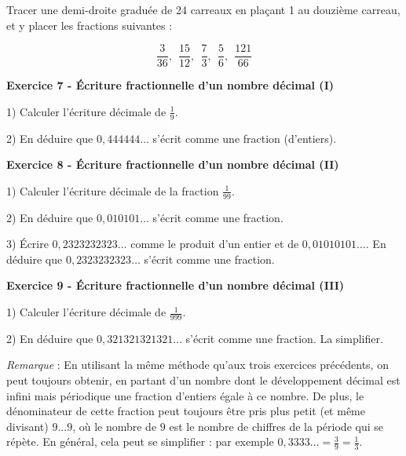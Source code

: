 \documentclass[12 pt]{article}
\theoremstyle{plain}
\newcounter{n}
\numberwithin{n}{section}
\begin{document}
Tracer une demi-droite graduée de 24 carreaux en plaçant 1 au douzième carreau, et y placer les fractions suivantes : 

\[  \frac{3}{36}, \ \ \frac{15}{12}, \ \ \frac{7}{3}, \ \ \frac{5}{6}, \ \ \frac{121}{66}   \]


\textbf{Exercice 7 - Écriture fractionnelle d'un nombre décimal (I)}

1) Calculer l'écriture décimale de $\frac19$.

2) En déduire que $0,444444\ldots$ s'écrit comme une fraction (d'entiers). 

\textbf{Exercice 8 - Écriture fractionnelle d'un nombre décimal (II)}

1) Calculer l'écriture décimale de la fraction $\frac1{99}$. 

2) En déduire que $0,010101\ldots$ s'écrit comme une fraction. 

3) Écrire $0,2323232323\ldots$ comme le produit d'un entier et de $0,01010101\ldots$. En déduire que 
$0,2323232323\ldots$ s'écrit comme une fraction. 


\textbf{Exercice 9 - Écriture fractionnelle d'un nombre décimal (III)}

1) Calculer l'écriture décimale de $\frac1{999}$. 

2) En déduire que $0,321321321321\ldots$ s'écrit comme une fraction. La simplifier. 

\emph{Remarque} : En utilisant la même méthode qu'aux trois exercices précédents, on peut toujours obtenir, 
en partant d'un nombre dont le développement décimal est infini mais périodique une fraction d'entiers égale à ce nombre. De plus, le dénominateur de cette fraction peut toujours être pris plus petit (et même divisant) $9...9$, où le nombre de $9$ est le nombre de chiffres de la période qui se répète. En général, cela peut se simplifier : par exemple $0,3333\ldots = \frac39 = \frac13$. 
	
\end{document}
